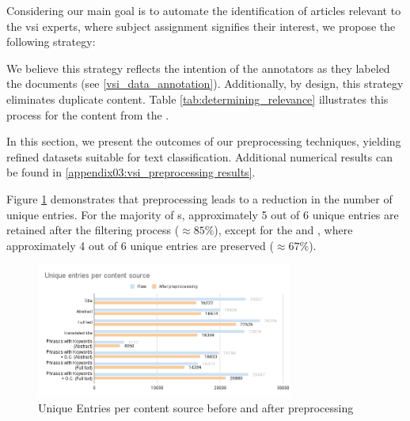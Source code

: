Considering our main goal is to automate the identification of articles relevant to the \gls{vsi} experts, where subject assignment signifies their interest, we propose the following strategy:


We believe this strategy reflects the intention of the annotators as they labeled the documents (see \headerName{} \ref{vsi_data_annotation}). Additionally, by design, this strategy eliminates duplicate content. Table \ref{tab:determining_relevance} illustrates this process for the content from the \trafilaturaTitle{}.




\clearpage
{}
\label{vsi_results_of_preprocessing}

In this section, we present the outcomes of our preprocessing techniques, yielding refined datasets suitable for text classification. Additional numerical results can be found in \appendixname{} \ref{appendix03:vsi_preprocessing results}.

Figure \ref{fig:05_unique_entries_after_preprocessing} demonstrates that preprocessing leads to a reduction in the number of unique entries. For the majority of \contentType{}s, approximately 5 out of 6 unique entries are retained after the filtering process ($\approx 85\%$), except for the \trafilaturaTitle{} and \trafilaturaAbstract{}, where approximately 4 out of 6 unique entries are preserved ($\approx 67\%$).


\begin{figure}
    \centering
    \includegraphics[width=0.75\textwidth]{Figures/05/Preprocessing_Unique entries per content source.png}
    \caption{Unique Entries per content source before and after preprocessing}
    \label{fig:05_unique_entries_after_preprocessing}
\end{figure}

